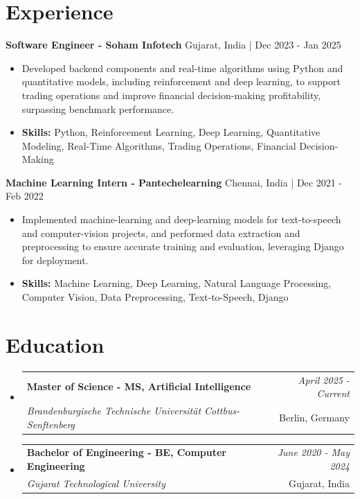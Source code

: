 \documentclass[a4paper,11pt]{article}
\makeatletter
\newcommand{\resumeSubheading}[4]{
\vspace{0.5mm}\item
    \begin{tabular*}{\linewidth}[t]{l@{\extracolsep{\fill}}r}
        \textbf{#1} & \textit{\footnotesize{#4}} \\
        \textit{\footnotesize{#3}} &  \footnotesize{#2}\\
    \end{tabular*}
    \vspace{-2.4mm}
}
\makeatother
\begin{document}
\section{\textbf{Experience}}


\vspace{1mm}
  \textbf{Software Engineer - Soham Infotech} \hfill Gujarat, India | Dec 2023 - Jan 2025
\vspace{-1.5mm} %
\begin{itemize}
  \item Developed backend components and real-time algorithms using Python and quantitative models, including reinforcement and deep learning, to support trading operations and improve financial decision-making profitability, surpassing benchmark performance.

\vspace{-2mm}
  \item \textbf{Skills:} Python, Reinforcement Learning, Deep Learning, Quantitative Modeling, Real-Time Algorithms, Trading Operations, Financial Decision-Making
\end{itemize}

\vspace{1mm}
  \textbf{Machine Learning Intern - Pantechelearning} \hfill Chennai, India | Dec 2021 - Feb 2022
\vspace{-1.5mm} %
\begin{itemize}
  \item Implemented machine-learning and deep-learning models for text-to-speech and computer-vision projects, and performed data extraction and preprocessing to ensure accurate training and evaluation, leveraging Django for deployment.
\vspace{-2mm}
  \item \textbf{Skills:} Machine Learning, Deep Learning, Natural Language Processing, Computer Vision, Data Preprocessing, Text-to-Speech, Django
\end{itemize}\section{\textbf{Education}}
\vspace{-0.4mm}

\begin{itemize}[leftmargin=0.15in, label={}]
\resumeSubheading
{Master of Science - MS, Artificial Intelligence }{Berlin, Germany}
{Brandenburgische Technische Universität Cottbus-Senftenberg  }{April 2025 - Current}

\vspace{1.0mm} %
\resumeSubheading
{Bachelor of Engineering - BE, Computer Engineering  }{Gujarat, India}
{Gujarat Technological University }{June 2020 - May 2024}

\end{itemize}
\end{document}
